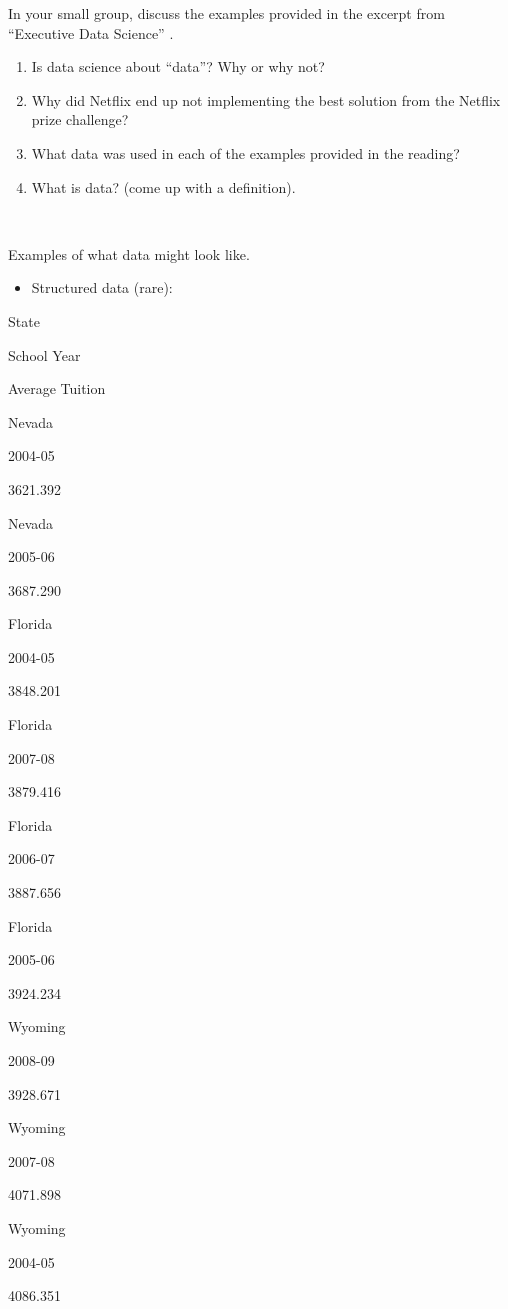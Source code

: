 \documentclass[
]{book}
\providecommand{\tightlist}{%
  \setlength{\itemsep}{0pt}\setlength{\parskip}{0pt}}
\begin{document}
In your small group, discuss the examples provided in the excerpt from ``Executive Data Science'' \citep{caffo2016executive}.

\begin{enumerate}
\def\labelenumi{\arabic{enumi})}
\item
  Is data science about ``data''? Why or why not?
\item
  Why did Netflix end up not implementing the best solution from the Netflix prize challenge?
\item
  What data was used in each of the examples provided in the reading?
\item
  What is data? (come up with a definition).
\end{enumerate}

~

Examples of what data might look like.

\begin{itemize}
\tightlist
\item
  Structured data (rare):
\end{itemize}

State

School Year

Average Tuition

Nevada

2004-05

3621.392

Nevada

2005-06

3687.290

Florida

2004-05

3848.201

Florida

2007-08

3879.416

Florida

2006-07

3887.656

Florida

2005-06

3924.234

Wyoming

2008-09

3928.671

Wyoming

2007-08

4071.898

Wyoming

2004-05

4086.351
\end{document}
